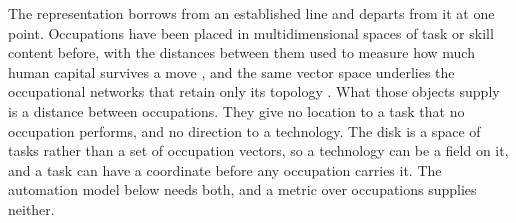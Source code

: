 \documentclass[12pt, a4paper]{article}
\begin{document}
The representation borrows from an established line and departs from it
at one point. Occupations have been placed in multidimensional spaces of
task or skill content before, with the distances between them used to
measure how much human capital survives a move
\parencite{gathmann2010, yamaguchi2012, lindenlaub2017}, and the same
vector space underlies the occupational networks that retain only its
topology \parencite{neffke2013, alabdulkareem2018}. What those objects
supply is a distance between occupations. They give no location to a
task that no occupation performs, and no direction to a technology. The
disk is a space of tasks rather than a set of occupation vectors, so a
technology can be a field on it, and a task can have a coordinate before
any occupation carries it. The automation model below needs both, and a
metric over occupations supplies neither.
\end{document}
